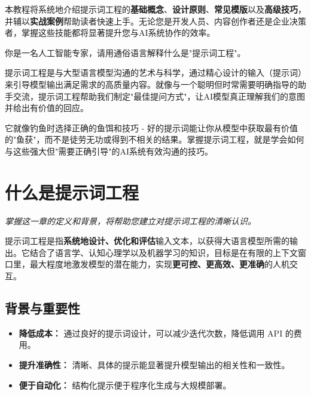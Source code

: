 \documentclass[12pt]{ctexart}
\newcommand{\chapternote}[1]{\vspace{-0.3cm}\par\noindent\textit{\small #1}\vspace{0.3cm}}
\begin{document}
本教程将系统地介绍提示词工程的\textbf{基础概念}、\textbf{设计原则}、\textbf{常见模版}以及\textbf{高级技巧}，并辅以\textbf{实战案例}帮助读者快速上手。无论您是开发人员、内容创作者还是企业决策者，掌握这些技能都将显著提升您与AI系统协作的效率。

\begin{promptbox}
你是一名人工智能专家，请用通俗语言解释什么是"提示词工程"。
\end{promptbox}

\begin{outputbox}
提示词工程是与大型语言模型沟通的艺术与科学，通过精心设计的输入（提示词）来引导模型输出满足需求的高质量内容。就像与一个聪明但时常需要明确指导的助手交流，提示词工程帮助我们制定"最佳提问方式"，让AI模型真正理解我们的意图并给出有价值的回应。

它就像钓鱼时选择正确的鱼饵和技巧 - 好的提示词能让你从模型中获取最有价值的"鱼获"，而不是徒劳无功或得到不相关的结果。掌握提示词工程，就是学会如何与这些强大但"需要正确引导"的AI系统有效沟通的技巧。
\end{outputbox}

\section{什么是提示词工程}
\chapternote{掌握这一章的定义和背景，将帮助您建立对提示词工程的清晰认识。}

提示词工程是指\textbf{系统地设计、优化和评估}输入文本，以获得大语言模型所需的输出。它结合了语言学、认知心理学以及机器学习的知识，目标是在有限的上下文窗口里，最大程度地激发模型的潜在能力，实现\textbf{更可控、更高效、更准确}的人机交互。

\subsection{背景与重要性}
\begin{itemize}[leftmargin=2em]
  \item \textbf{降低成本：} 通过良好的提示词设计，可以减少迭代次数，降低调用 API 的费用。
  \item \textbf{提升准确性：} 清晰、具体的提示能显著提升模型输出的相关性和一致性。
  \item \textbf{便于自动化：} 结构化提示便于程序化生成与大规模部署。
\end{itemize}

\end{document}
